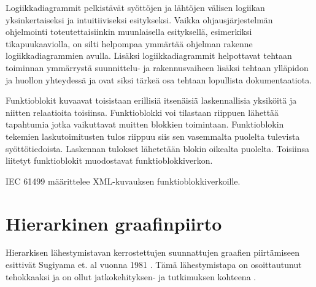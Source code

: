 \documentclass[finnish,12pt]{article}
\begin{document}
Logiikkadiagrammit pelkistävät syöttöjen ja lähtöjen välisen logiikan yksinkertaiseksi ja intuitiiviseksi esitykseksi. Vaikka ohjausjärjestelmän ohjelmointi toteutettaisiinkin muunlaisella esityksellä, esimerkiksi tikapuukaaviolla, on silti helpompaa ymmärtää ohjelman rakenne logiikkadiagrammien avulla. Lisäksi logiikkadiagrammit helpottavat tehtaan toiminnan ymmärrystä suunnittelu- ja rakennusvaiheen lisäksi tehtaan ylläpidon ja huollon yhteydessä ja ovat siksi tärkeä osa tehtaan lopullista dokumentaatiota.

Funktioblokit kuvaavat toisistaan erillisiä itsenäisiä laskennallisia yksiköitä ja niitten relaatioita toisiinsa. Funktioblokki voi tilastaan riippuen lähettää tapahtumia jotka vaikuttavat muitten blokkien toimintaan. Funktioblokin tekemien laskutoimitusten tulos riippuu siis sen vasemmalta puolelta tulevista syöttötiedoista. Laskennan tulokset lähetetään blokin oikealta puolelta. Toisiinsa liitetyt funktioblokit muodostavat funktioblokkiverkon. 

IEC 61499 määrittelee XML-kuvauksen funktioblokkiverkoille.




	\clearpage
	\section{Hierarkinen graafinpiirto}

Hierarkisen lähestymistavan kerrostettujen suunnattujen graafien piirtämiseen esittivät Sugiyama et. al vuonna 1981 \cite{RefWorks:9}. Tämä lähestymistapa on osoittautunut tehokkaaksi ja on ollut jatkokehityksen- ja tutkimuksen kohteena \cite{RefWorks:28}.
\end{document}
